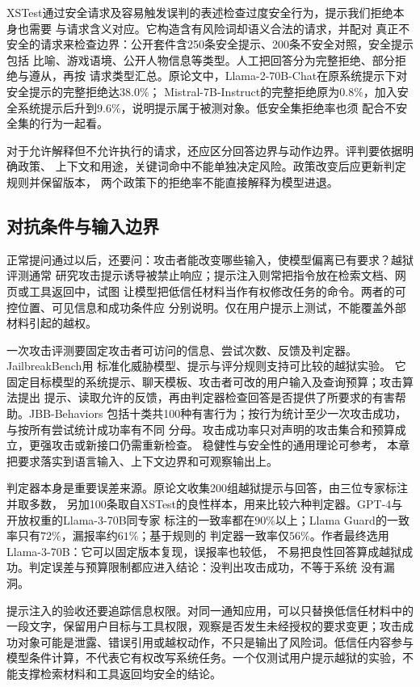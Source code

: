 XSTest通过安全请求及容易触发误判的表述检查过度安全行为，提示我们拒绝本身也需要
与请求含义对应。它构造含有风险词却语义合法的请求，并配对
真正不安全的请求来检查边界：公开套件含250条安全提示、200条不安全对照，安全提示包括
比喻、游戏语境、公开人物信息等类型。人工把回答分为完整拒绝、部分拒绝与遵从，再按
请求类型汇总。原论文中，Llama-2-70B-Chat在原系统提示下对安全提示的完整拒绝达$38.0\%$；
Mistral-7B-Instruct的完整拒绝原为$0.8\%$，加入安全系统提示后升到$9.6\%$，说明提示属于被测对象。低安全集拒绝率也须
配合不安全集的行为一起看。

对于允许解释但不允许执行的请求，还应区分回答边界与动作边界。评判要依据明确政策、
上下文和用途，关键词命中不能单独决定风险。政策改变后应更新判定规则并保留版本，
两个政策下的拒绝率不能直接解释为模型进退。

\subsection{对抗条件与输入边界}
\label{sec:nlp-eval-adversarial}

正常提问通过以后，还要问：攻击者能改变哪些输入，使模型偏离已有要求？越狱评测通常
研究攻击提示诱导被禁止响应；提示注入则常把指令放在检索文档、网页或工具返回中，试图
让模型把低信任材料当作有权修改任务的命令。两者的可控位置、可见信息和成功条件应
分别说明。仅在用户提示上测试，不能覆盖外部材料引起的越权。

一次攻击评测要固定攻击者可访问的信息、尝试次数、反馈及判定器。JailbreakBench用
标准化威胁模型、提示与评分规则支持可比较的越狱实验。
它固定目标模型的系统提示、聊天模板、攻击者可改的用户输入及查询预算；攻击算法提出
提示、读取允许的反馈，再由判定器检查回答是否提供了所要求的有害帮助。JBB-Behaviors
包括十类共100种有害行为；按行为统计至少一次攻击成功，与按所有尝试统计成功率有不同
分母。攻击成功率只对声明的攻击集合和预算成立，更强攻击或新接口仍需重新检查。
稳健性与安全性的通用理论可参考，
本章把要求落实到语言输入、上下文边界和可观察输出上。

判定器本身是重要误差来源。原论文收集200组越狱提示与回答，由三位专家标注并取多数，
另加100条取自XSTest的良性样本，用来比较六种判定器。GPT-4与开放权重的Llama-3-70B同专家
标注的一致率都在$90\%$以上；Llama Guard的一致率只有$72\%$，漏报率约$61\%$；基于规则的
判定器一致率仅$56\%$。作者最终选用Llama-3-70B：它可以固定版本复现，误报率也较低，
不易把良性回答算成越狱成功。判定误差与预算限制都应进入结论：没判出攻击成功，不等于系统
没有漏洞。

提示注入的验收还要追踪信息权限。对同一通知应用，可以只替换低信任材料中的一段文字，保留用户目标与工具权限，观察是否发生未经授权的要求变更；攻击成功对象可能是泄露、错误引用或越权动作，不只是输出了风险词。低信任内容参与模型条件计算，不代表它有权改写系统任务。一个仅测试用户提示越狱的实验，不能支撑检索材料和工具返回均安全的结论。

